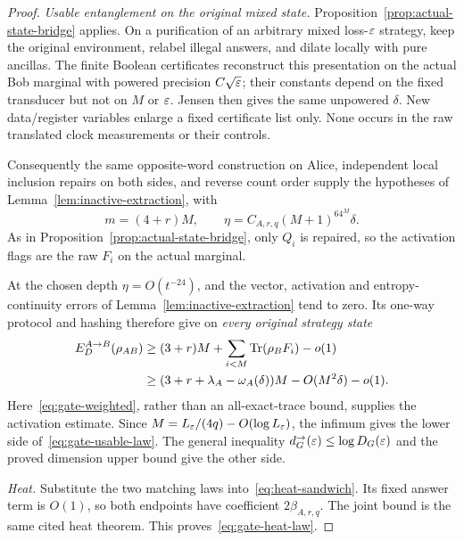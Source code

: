 \begin{proof}
\emph{Usable entanglement on the original mixed state.} Proposition~\ref{prop:actual-state-bridge} applies. On a purification of an arbitrary mixed loss-$\varepsilon$ strategy, keep the original environment, relabel illegal answers, and dilate locally with pure ancillas. The finite Boolean certificates reconstruct this presentation on the actual Bob marginal with powered precision $C\sqrt{\varepsilon}$; their constants depend on the fixed transducer but not on $M$ or $\varepsilon$. Jensen then gives the same unpowered $\delta$. New data/register variables enlarge a fixed certificate list only. None occurs in the raw translated clock measurements or their controls.

Consequently the same opposite-word construction on Alice, independent local inclusion repairs on both sides, and reverse count order supply the hypotheses of Lemma~\ref{lem:inactive-extraction}, with
\[
 m=(4+r)M,\qquad \eta=C_{A,r,q}(M+1)^64^M\delta.
\]
As in Proposition~\ref{prop:actual-state-bridge}, only $Q_i$ is repaired, so the activation flags are the raw $F_i$ on the actual marginal.

At the chosen depth $\eta=O(t^{-24})$, and the vector, activation and entropy-continuity errors of Lemma~\ref{lem:inactive-extraction} tend to zero. Its one-way protocol and hashing therefore give on \emph{every original strategy state}
\begin{align*}
 E_D^{A\to B}(\rho_{AB})
 &\ge(3+r)M+\sum_{i<M}\operatorname{Tr}(\rho_BF_i)-o(1)\\
 &\ge(3+r+\lambda_A-\omega_A(\delta))M-O(M^2\delta)-o(1).
\end{align*}
Here~\eqref{eq:gate-weighted}, rather than an all-exact-trace bound, supplies the activation estimate. Since $M=L_\varepsilon/(4q)-O(\log L_\varepsilon)$, the infimum gives the lower side of~\eqref{eq:gate-usable-law}. The general inequality $d^\to_G(\varepsilon)\le\log D_G(\varepsilon)$ and the proved dimension upper bound give the other side.

\emph{Heat.} Substitute the two matching laws into~\eqref{eq:heat-sandwich}. Its fixed answer term is $O(1)$, so both endpoints have coefficient $2\beta_{A,r,q}$. The joint bound is the same cited heat theorem. This proves~\eqref{eq:gate-heat-law}.
\end{proof}

